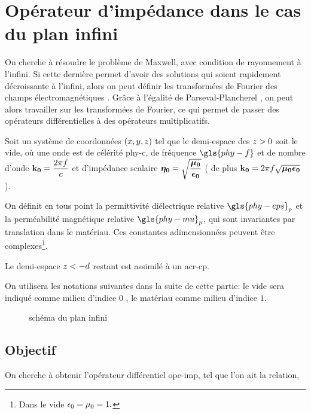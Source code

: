 \section{Opérateur d'impédance dans le cas du plan infini}\label{sec:coeffs_ref}

On cherche à résoudre le problème de Maxwell, avec condition de rayonnement à l'infini. Si cette dernière permet d'avoir des solutions qui soient rapidement décroissante à l'infini, alors on peut définir les transformées de Fourier des champs électromagnétiques \cite[p.~146]{yosida_functional_1995}. Grâce à l'égalité de Parseval-Plancherel \cite[p.~153]{yosida_functional_1995}, on peut alors travailler sur les transformées de Fourier, ce qui permet de passer des opérateurs différentielles à des opérateurs multiplicatifs.



Soit un système de coordonnées $(\x,\y,\z)$ tel que le demi-espace des $\z>0$ soit le vide, où une onde est de célérité \gls{phy-c}, de fréquence $\gls{phy-f}$ et de nombre d'onde $\kO=\frac{2\pi f}{c}$  et d'impédance scalaire $\etaO = \sqrt{\frac{\muO}{\epsO}}$ ( de plus $\kO=2\pi f\sqrt{\muO\epsO}$ ).

On définit en tous point la permittivité diélectrique relative $\gls{phy-eps}_p$ et la perméabilité magnétique relative $\gls{phy-mu}_p$, qui sont invariantes par translation dans le matériau.
 Ces constantes adimensionnées peuvent être complexes\footnote{Dans le vide $\eps_0=\mu_0=1.$}.

Le demi-espace $\z<-d$ restant est assimilé à un \gls{acr-cp}.

On utilisera les notations  suivantes dans la suite de cette partie: le vide sera indiqué comme milieu d'indice $0$ , le matériau comme milieu d'indice $1$.

\begin{figure}[h!]
\centering
\begin{tikzpicture}

\end{tikzpicture}
\caption{schéma du plan infini}
\end{figure}\label{fig:tikz:plan}

\subsection{Objectif}
On cherche à obtenir l'opérateur différentiel \gls{ope-imp}, tel que l'on ait la relation,

